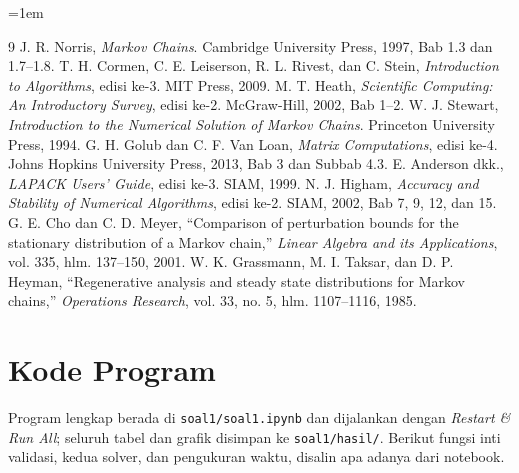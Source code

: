 \documentclass[12pt,a4paper]{article}
\numberwithin{equation}{section}
\begin{document}
\renewcommand{\refname}{Referensi}
\emergencystretch=1em
\begin{thebibliography}{9}
 J. R. Norris, \emph{Markov Chains}. Cambridge University Press, 1997, Bab 1.3 dan 1.7--1.8.
 T. H. Cormen, C. E. Leiserson, R. L. Rivest, dan C. Stein, \emph{Introduction to Algorithms},
  edisi ke-3. MIT Press, 2009.
 M. T. Heath, \emph{Scientific Computing: An Introductory Survey}, edisi ke-2. McGraw-Hill, 2002,
  Bab 1--2.
 W. J. Stewart, \emph{Introduction to the Numerical Solution of Markov Chains}. Princeton
  University Press, 1994.
 G. H. Golub dan C. F. Van Loan, \emph{Matrix Computations}, edisi ke-4. Johns Hopkins University
  Press, 2013, Bab 3 dan Subbab 4.3.
 E. Anderson dkk., \emph{LAPACK Users' Guide}, edisi ke-3. SIAM, 1999.
 N. J. Higham, \emph{Accuracy and Stability of Numerical Algorithms}, edisi ke-2. SIAM, 2002,
  Bab 7, 9, 12, dan 15.
 G. E. Cho dan C. D. Meyer, ``Comparison of perturbation bounds for the stationary distribution of a
  Markov chain,'' \emph{Linear Algebra and its Applications}, vol. 335, hlm. 137--150, 2001.
 W. K. Grassmann, M. I. Taksar, dan D. P. Heyman, ``Regenerative analysis and steady state distributions
  for Markov chains,'' \emph{Operations Research}, vol. 33, no. 5, hlm. 1107--1116, 1985.
\end{thebibliography}

\appendix
\section{Kode Program}\label{lamp:kode}
Program lengkap berada di \texttt{soal1/soal1.ipynb} dan dijalankan dengan \emph{Restart \& Run All}; seluruh tabel
dan grafik disimpan ke \texttt{soal1/hasil/}. Berikut fungsi inti validasi, kedua solver, dan pengukuran waktu, disalin
apa adanya dari notebook.

\end{document}
